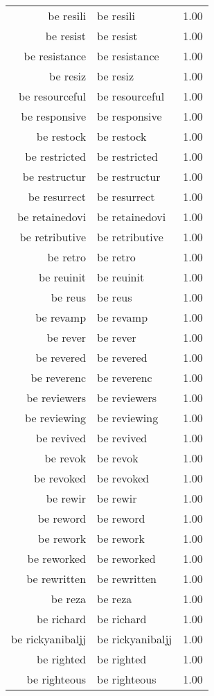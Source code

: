 \begin{table}[ht]
\begin{tabular}{rlr}
  be resili & be resili & 1.00 \\ 
  be resist & be resist & 1.00 \\ 
  be resistance & be resistance & 1.00 \\ 
  be resiz & be resiz & 1.00 \\ 
  be resourceful & be resourceful & 1.00 \\ 
  be responsive & be responsive & 1.00 \\ 
  be restock & be restock & 1.00 \\ 
  be restricted & be restricted & 1.00 \\ 
  be restructur & be restructur & 1.00 \\ 
  be resurrect & be resurrect & 1.00 \\ 
  be retainedovi & be retainedovi & 1.00 \\ 
  be retributive & be retributive & 1.00 \\ 
  be retro & be retro & 1.00 \\ 
  be reuinit & be reuinit & 1.00 \\ 
  be reus & be reus & 1.00 \\ 
  be revamp & be revamp & 1.00 \\ 
  be rever & be rever & 1.00 \\ 
  be revered & be revered & 1.00 \\ 
  be reverenc & be reverenc & 1.00 \\ 
  be reviewers & be reviewers & 1.00 \\ 
  be reviewing & be reviewing & 1.00 \\ 
  be revived & be revived & 1.00 \\ 
  be revok & be revok & 1.00 \\ 
  be revoked & be revoked & 1.00 \\ 
  be rewir & be rewir & 1.00 \\ 
  be reword & be reword & 1.00 \\ 
  be rework & be rework & 1.00 \\ 
  be reworked & be reworked & 1.00 \\ 
  be rewritten & be rewritten & 1.00 \\ 
  be reza & be reza & 1.00 \\ 
  be richard & be richard & 1.00 \\ 
  be rickyanibaljj & be rickyanibaljj & 1.00 \\ 
  be righted & be righted & 1.00 \\ 
  be righteous & be righteous & 1.00 \\ 

\end{tabular}
\end{table}
